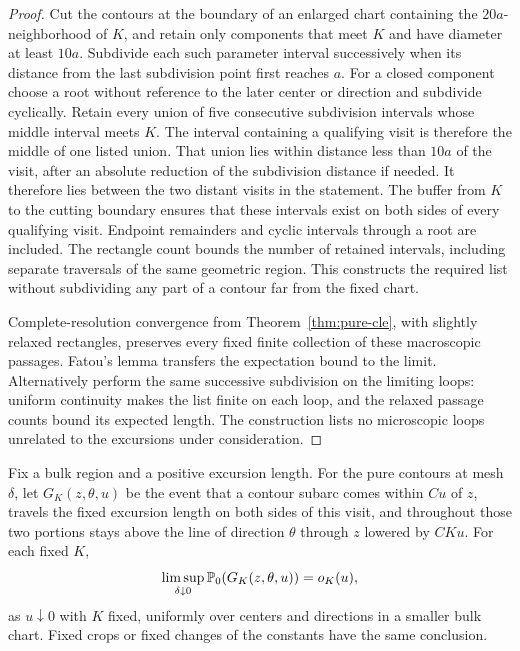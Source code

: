 \begin{proof}
Cut the contours at the boundary of an enlarged chart containing the
$20a$-neighborhood of $K$, and retain only components that meet $K$
and have diameter at least $10a$.
Subdivide each such parameter interval successively when its distance
from the last subdivision point first reaches $a$.  For a closed
component choose a root without reference to the later center or
direction and subdivide cyclically.  Retain every union of five consecutive
subdivision intervals whose middle interval meets $K$.  The interval
containing a qualifying visit is therefore the middle of one listed
union.  That union lies within distance less than $10a$ of the visit, after an absolute reduction of the
subdivision distance if needed.  It therefore lies between the two
distant visits in the statement.  The buffer from $K$ to the cutting
boundary ensures that these intervals exist on both sides of every
qualifying visit.  Endpoint remainders and cyclic intervals through a
root are included.  The rectangle count bounds the number of retained
intervals, including separate traversals of the same geometric region.
This constructs the required list without subdividing any part of a
contour far from the fixed chart.

Complete-resolution convergence from Theorem~\ref{thm:pure-cle},
with slightly relaxed rectangles, preserves every fixed finite
collection of these macroscopic passages.  Fatou's lemma transfers
the expectation bound to the limit.  Alternatively perform the same
successive subdivision on the limiting loops: uniform continuity
makes the list finite on each loop, and the relaxed passage counts
bound its expected length.  The construction lists no microscopic
loops unrelated to the excursions under consideration.
\end{proof}

\begin{lemma}
\label{lem:stability-tangency}
Fix a bulk region and a positive excursion length.  For the pure
contours at mesh $\delta$, let $G_K(z,\theta,u)$ be the event that a contour subarc
comes within $C u$ of $z$, travels the fixed excursion length on both
sides of this visit, and throughout those two portions stays above
the line of direction $\theta$ through $z$ lowered by $CKu$.
For each fixed $K$,
\begin{equation}
 \limsup_{\delta\downarrow0}\P_0(G_K(z,\theta,u))=o_K(u),
 \label{eq:stability-tangency}
\end{equation}
as $u\downarrow0$ with $K$ fixed, uniformly over centers and directions
in a smaller bulk chart. Fixed crops or fixed changes of the constants
have the same conclusion.
\end{lemma}

